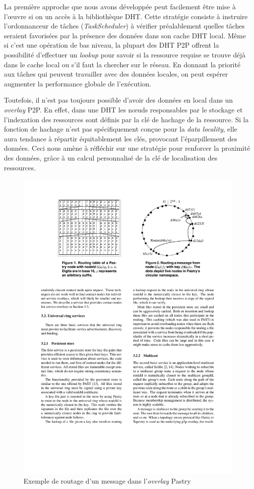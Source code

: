 La première approche que nous avons développée peut facilement être mise à l'{\oe}uvre si on un accès à la bibliothèque DHT. Cette stratégie consiste à instruire l'ordonnanceur de tâches (\textit{TaskScheduler}) à vérifier préalablement quelles tâches seraient favorisées par la présence des données dans son cache DHT local. Même si c'est une opération de bas niveau, la plupart des DHT P2P offrent la possibilité d'effectuer un \textit{lookup} pour savoir si la ressource requise se trouve déjà dans le cache local ou s'il faut la chercher sur le réseau. En donnant la priorité aux tâches qui peuvent travailler avec des données locales, on peut espérer augmenter la performance globale de l'exécution.

Toutefois, il n'est pas toujours possible d'avoir des données en local dans un \textit{overlay} P2P. En effet, dans une DHT les n{\oe}uds responsables par le stockage et l'indexation des ressources sont définis par la clé de hachage de la ressource. Si la fonction de hachage n'est pas spécifiquement conçue pour la \textit{data locality}, elle aura tendance à répartir équitablement les clés, provocant l'éparpillement des données.  Ceci nous amène à réfléchir sur une stratégie pour renforcer la proximité des données, grâce à un calcul personnalisé de la clé de localisation des ressources. 


\begin{figure}[!ht]
	\centering
	\includegraphics[width=0.4\linewidth]{img/AnneauPastry.pdf}
	\caption{Exemple de routage d'un message dans l'\textit{overlay} Pastry \cite{Castro2002}}
	\label{fig:pastry}
\end{figure}


